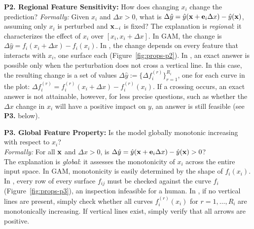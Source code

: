 \textbf{P2. Regional Feature Sensitivity:} How does changing $x_i$ change the prediction? 
\textit{Formally:} Given $x_i$ and $\Delta x>0$, what is $\Delta \hat{y} = \hat y(\mathbf{x} +  \mathbf{e}_i \Delta x )-\hat y(\mathbf{x})$, assuming only $x_i$ is perturbed and $\mathbf{x}_{-i}$ is fixed? 
The explanation is \emph{regional}: it characterizes the effect of $x_i$ over $[x_i, x_i + \Delta x]$.
In GAM, the change is $\Delta \hat{y} = f_i(x_i+\Delta x)-f_i(x_i)$.
In \gamm, the change depends on every feature that interacts with $x_i$, one surface each (Figure~\ref{fig:props-p2}).
In \method, an exact answer is possible only when the perturbation does not cross a vertical line. 
In this case, the resulting change is a set of values $\Delta \hat{y} := \{ \Delta f_i^{(r)}\}_{r=1}^{R_i}$, one for each curve in the plot: $\Delta f_i^{(r)} = f_i^{(r)}(x_i+\Delta x)-f_i^{(r)}(x_i)$. 
If a crossing occurs, an exact answer is not attainable, however, for less precise questions, such as whether the $\Delta x$ change in $x_i$ will have a positive impact on $y$, an answer is still feasible (see \textbf{P3.} below).

\textbf{P3. Global Feature Property:} Is the model globally monotonic increasing with respect to $x_i$?\\ 
\textit{Formally:} For all $\mathbf{x}$ and $\Delta x>0$, is $\Delta \hat{y} = \hat y(\mathbf{x} + \mathbf{e}_i \Delta x )-\hat y(\mathbf{x}) > 0$?\\
The explanation is \textit{global}: it assesses the monotonicity of $x_i$ across the entire input space.
In GAM, monotonicity is easily determined by the shape of $f_i(x_i)$.
In \gamm, every row of every surface $f_{ij}$ must be checked against the curve $f_i$ (Figure~\ref{fig:props-p3}), an inspection infeasible for a human.
In \method, if no vertical lines are present, simply check whether all curves $f_i^{(r)}(x_i)$ for $r=1, \ldots, R_i$ are monotonically increasing. If vertical lines exist, simply verify that all arrows are positive.
